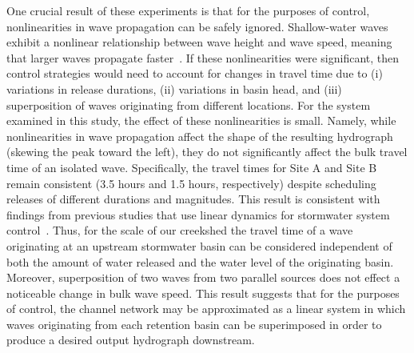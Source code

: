 One crucial result of these experiments is that for the purposes of control, nonlinearities in wave propagation can be safely ignored. Shallow-water waves exhibit a nonlinear relationship between wave height and wave speed, meaning that larger waves propagate faster~\cite{kinnmark2012shallow}. %
If these nonlinearities were significant, then control strategies would need to account for changes in travel time due to (i) variations in release durations, (ii) variations in basin head, and (iii) superposition of waves originating from different locations.
For the system examined in this study, the effect of these nonlinearities is small. Namely, while nonlinearities in wave propagation affect the shape of the resulting hydrograph (skewing the peak toward the left), they do not significantly affect the bulk travel time of an isolated wave.
Specifically, the travel times for Site A and Site B remain consistent (3.5 hours and 1.5 hours, respectively) despite scheduling releases of different durations and magnitudes. This result is consistent with findings from previous studies that use linear dynamics for stormwater system control~\cite{Litrico_2004, Marinaki_2003, Garcia_2015}.
Thus, for the scale of our creekshed the travel time of a wave originating at an upstream stormwater basin can be considered independent of both the amount of water released and the water level of the originating basin. Moreover, superposition of two waves from two parallel sources does not effect a noticeable change in bulk wave speed. This result suggests that for the purposes of control, the channel network may be approximated as a linear system in which waves originating from each retention basin can be superimposed in order to produce a desired output hydrograph downstream. 


